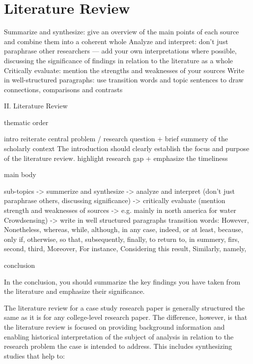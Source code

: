 
\chapter{Literature Review} %

\label{Chapter2} %

Summarize and synthesize: give an overview of the main points of each source and combine them into a coherent whole
Analyze and interpret: don’t just paraphrase other researchers — add your own interpretations where possible, discussing the significance of findings in relation to the literature as a whole
Critically evaluate: mention the strengths and weaknesses of your sources
Write in well-structured paragraphs: use transition words and topic sentences to draw connections, comparisons and contrasts

II.  Literature Review

thematic order

intro 
reiterate central problem / research question + brief summery of the scholarly context
The introduction should clearly establish the focus and purpose of the literature review.
highlight research gap + emphasize the timeliness

main body

sub-topics
-> summerize and synthesize
-> analyze and interpret (don't just paraphrase others, discussing significance)
-> critically evaluate (mention strength and weaknesses of sources -> e.g. mainly in north america for water Crowdsensing)
-> write in well structured paragraphs
    transition words: However, Nonetheless, whereas, while, although, in any case, indeed, or at least, because, only if, otherwise, so that, subsequently, finally, to return to, in summery, firs, second, third, Moreover, For instance, Considering this result, Similarly, namely,


conclusion

In the conclusion, you should summarize the key findings you have taken from the literature and emphasize their significance.

The literature review for a case study research paper is generally structured the same as it is for any college-level research paper. The difference, however, is that the literature review is focused on providing background information and enabling historical interpretation of the subject of analysis in relation to the research problem the case is intended to address. This includes synthesizing studies that help to:


